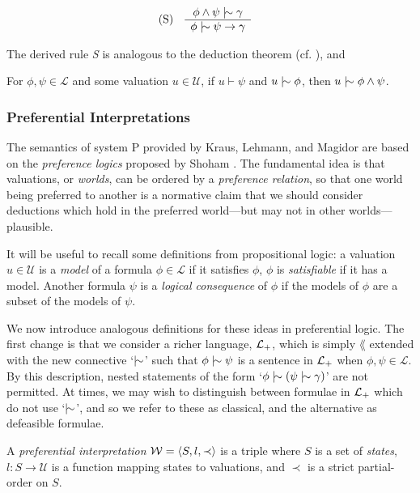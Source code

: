 \begin{align}
	\inferLeft{S}{\phi \land \psi \twiddle \gamma}{\phi \twiddle \psi \rightarrow \gamma}
\end{align}

The derived rule \textit{S} is analogous to the deduction theorem (cf. ), and

\begin{lemma}
	For $\phi, \psi \in \mathcal{L}$ and some valuation $u \in \mathcal{U}$, if $u \vdash \psi$ and $u \twiddle \phi$, then
	$u \twiddle \phi \land \psi$.
\end{lemma}

\subsubsection{Preferential Interpretations}
\label{subsubsection:preferential-interpretations}

The semantics of system P provided by Kraus, Lehmann, and Magidor \cite{kraus1990nonmonotonic} are based on the \textit{preference
logics} proposed by Shoham \cite{shohamSemanticApproach}. The fundamental idea is that valuations, or \textit{worlds}, can
be ordered by a \textit{preference relation}, so that one world being preferred to another is a normative claim that we should
consider deductions which hold in the preferred world---but may not in other worlds---plausible.

It will be useful to recall some definitions from propositional logic: a valuation $u \in \mathcal{U}$ is a \textit{model}
of a formula $\phi \in \mathcal{L}$ if it satisfies $\phi$, $\phi$ is \textit{satisfiable} if it has a model. Another
formula $\psi$ is a \textit{logical consequence} of $\phi$ if the models of $\phi$ are a subset of the models of $\psi$.

We now introduce analogous definitions for these ideas in preferential logic. The first change is that we consider a
richer language, $\mathcal{L}_+$, which is simply $\lang$ extended with the new connective `$\twiddle$' such that
$\phi \twiddle \psi$ is a sentence in $\mathcal{L}_+$ when $\phi, \psi \in \mathcal{L}$. By this description, nested statements
of the form `$\phi \twiddle (\psi \twiddle \gamma )$' are not permitted. At times, we may wish to distinguish between
formulae in $\mathcal{L}_+$ which do not use `$\twiddle$', and so we refer to these as classical, and the alternative as
defeasible formulae.

\begin{definition}
	\label{definition:preferential-interpretation} 

	A \emph{preferential interpretation} $\mathcal{W} = \langle S,l,\prec \rangle$ is a triple where $S$ is a set of \emph{states}, $l: S \to \mathcal{U}$ is
	a function mapping states to valuations, and $\prec$ is a strict partial-order on $S$.
\end{definition}

